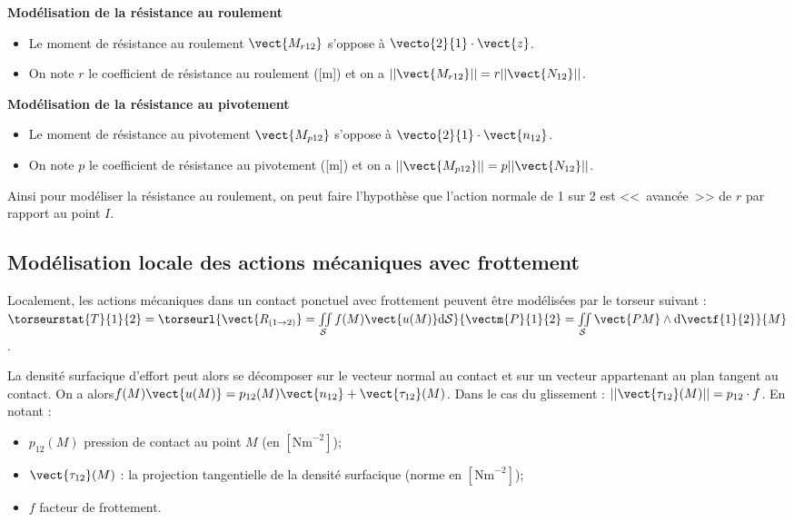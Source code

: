 \noindent\begin{minipage}[t]{.49\linewidth}
\begin{center}
\textbf{Modélisation de la résistance au roulement}
\end{center}
\begin{itemize}
\item Le moment de résistance au roulement $\vect{M_{r12}}$ s'oppose à $\vecto{2}{1}\cdot \vect{z}$. 
\item On note $r$ le coefficient de résistance au roulement ([m]) et on a $||\vect{M_{r12}}||=r||\vect{N_{12}} ||$.
\end{itemize}

\end{minipage}\hfill
\begin{minipage}[t]{.49\linewidth}
\begin{center}
\textbf{Modélisation de la résistance au pivotement}
\end{center}
\begin{itemize}
\item Le moment de résistance au pivotement $\vect{M_{p12}}$ s'oppose à $\vecto{2}{1}\cdot \vect{n_{12}}$. 
\item On note $p$ le coefficient de résistance au pivotement ([m]) et on a $||\vect{M_{p12}}||=p||\vect{N_{12}} ||$.
\end{itemize}
\end{minipage}

\vspace{1cm}


Ainsi pour modéliser la résistance au roulement, on peut faire l'hypothèse que l'action normale de 1 sur 2 est <<~avancée~>> de $r$ par rapport au point $I$. 


\subsection{Modélisation locale des actions mécaniques avec frottement}
\begin{defi}
Localement, les actions mécaniques dans un contact ponctuel avec frottement peuvent être modélisées par le torseur suivant :
$
\torseurstat{T}{1}{2}=
\torseurl{%
\vect{R_{(1\rightarrow 2)}} 
= \iint\limits_{\mathcal{S}} f(M) \vect{u(M)} \text{d}\mathcal{S}}{%
\vectm{P}{1}{2} = \iint\limits_{\mathcal{S}}\vect{PM}\wedge \text{d}\vectf{1}{2}}{M}
$.

La densité surfacique d'effort peut alors se décomposer sur le vecteur normal au contact et sur un vecteur appartenant au plan tangent au contact. On a alors$f(M) \vect{u(M)} = p_{12}(M)\vect{n_{12}}+\vect{\tau_{12}}(M)$. 
Dans le cas du glissement : $||\vect{\tau_{12}}(M)||=p_{12}\cdot f$.
En notant : 
\begin{itemize}
\item $p_{12}(M)$ pression de contact au point $M$ (en $\left[\text{Nm}^{-2}\right]$);
\item $\vect{\tau_{12}}(M)$ : la projection tangentielle de la densité surfacique (norme en $\left[\text{Nm}^{-2}\right]$);
\item $f$ facteur de frottement.
\end{itemize}
\end{defi}

